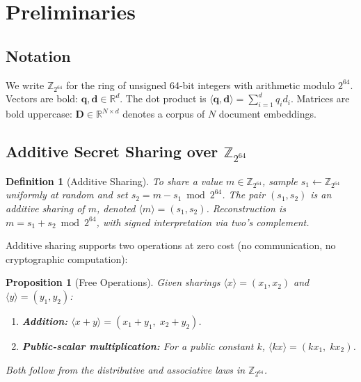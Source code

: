\documentclass[11pt]{article}
\newtheorem{proposition}[theorem]{Proposition}
\newtheorem{definition}[theorem]{Definition}
\newcommand{\Z}{\mathbb{Z}}
\newcommand{\R}{\mathbb{R}}
\begin{document}
\section{Preliminaries}
\label{sec:prelim}

\subsection{Notation}

We write $\Z_{2^{64}}$ for the ring of unsigned 64-bit integers with arithmetic modulo $2^{64}$. Vectors are bold: $\mathbf{q}, \mathbf{d} \in \R^d$. The dot product is $\langle \mathbf{q}, \mathbf{d} \rangle = \sum_{i=1}^{d} q_i d_i$. Matrices are bold uppercase: $\mathbf{D} \in \R^{N \times d}$ denotes a corpus of $N$ document embeddings.

\subsection{Additive Secret Sharing over $\Z_{2^{64}}$}

\begin{definition}[Additive Sharing]
\label{def:sharing}
To share a value $m \in \Z_{2^{64}}$, sample $s_1 \leftarrow \Z_{2^{64}}$ uniformly at random and set $s_2 = m - s_1 \bmod 2^{64}$. The pair $(s_1, s_2)$ is an additive sharing of $m$, denoted $\langle m \rangle = (s_1, s_2)$. Reconstruction is $m = s_1 + s_2 \bmod 2^{64}$, with signed interpretation via two's complement.
\end{definition}

Additive sharing supports two operations at zero cost (no communication, no cryptographic computation):

\begin{proposition}[Free Operations]
\label{prop:free-ops}
Given sharings $\langle x \rangle = (x_1, x_2)$ and $\langle y \rangle = (y_1, y_2)$:
\begin{enumerate}
\item \textbf{Addition:} $\langle x + y \rangle = (x_1 + y_1,\; x_2 + y_2)$.
\item \textbf{Public-scalar multiplication:} For a public constant $k$, $\langle kx \rangle = (k x_1,\; k x_2)$.
\end{enumerate}
Both follow from the distributive and associative laws in $\Z_{2^{64}}$.
\end{proposition}
\end{document}
